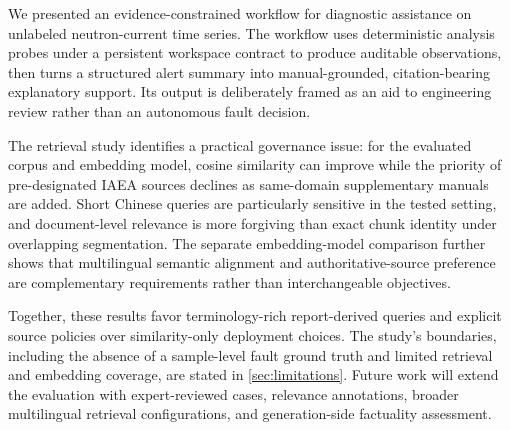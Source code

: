 We presented an evidence-constrained workflow for diagnostic assistance on unlabeled neutron-current time series. The workflow uses deterministic analysis probes under a persistent workspace contract to produce auditable observations, then turns a structured alert summary into manual-grounded, citation-bearing explanatory support. Its output is deliberately framed as an aid to engineering review rather than an autonomous fault decision.

The retrieval study identifies a practical governance issue: for the evaluated corpus and embedding model, cosine similarity can improve while the priority of pre-designated IAEA sources declines as same-domain supplementary manuals are added. Short Chinese queries are particularly sensitive in the tested setting, and document-level relevance is more forgiving than exact chunk identity under overlapping segmentation. The separate embedding-model comparison further shows that multilingual semantic alignment and authoritative-source preference are complementary requirements rather than interchangeable objectives.

Together, these results favor terminology-rich report-derived queries and explicit source policies over similarity-only deployment choices. The study's boundaries, including the absence of a sample-level fault ground truth and limited retrieval and embedding coverage, are stated in \cref{sec:limitations}. Future work will extend the evaluation with expert-reviewed cases, relevance annotations, broader multilingual retrieval configurations, and generation-side factuality assessment.
